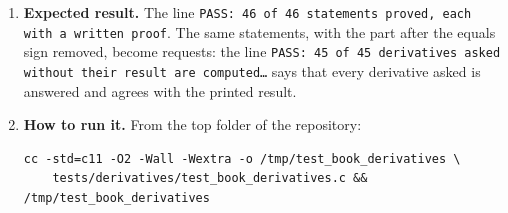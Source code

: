 \documentclass[11pt,a4paper]{article}
\begin{document}
\begin{enumerate}
\item \textbf{Expected result.} The line \texttt{PASS: 46 of 46 statements proved, each with a written proof}. The same statements, with the part after the equals sign removed, become requests: the line \texttt{PASS: 45 of 45 derivatives asked without their result are computed\ldots} says that every derivative asked is answered and agrees with the printed result.

\item \textbf{How to run it.} From the top folder of the repository:
\begin{verbatim}
cc -std=c11 -O2 -Wall -Wextra -o /tmp/test_book_derivatives \
    tests/derivatives/test_book_derivatives.c && /tmp/test_book_derivatives
\end{verbatim}
\end{enumerate}
\end{document}
